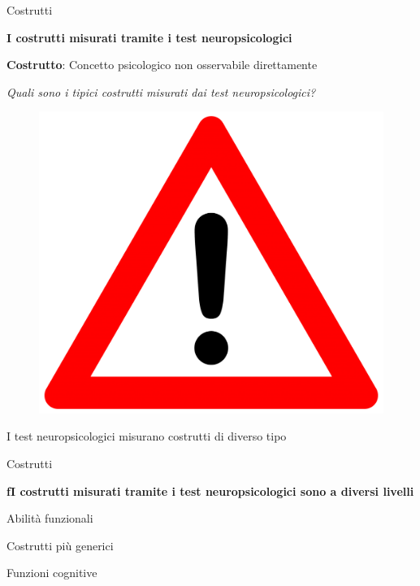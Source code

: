 \documentclass[
  ignorenonframetext,
]{beamer}
\begin{document}
\begin{frame}{Costrutti}
\label{costrutti}
\begin{center}
  \textbf{I costrutti misurati tramite i test neuropsicologici}
\end{center}

\textbf{Costrutto}: Concetto psicologico non osservabile direttamente

\emph{Quali sono i tipici costrutti misurati dai test neuropsicologici?}

\begin{figure}
  \includegraphics[scale=0.05]{Figures/triangle.png}
\end{figure}

I test neuropsicologici misurano costrutti di diverso tipo
\end{frame}

\begin{frame}{Costrutti}
\label{costrutti-1}
\begin{center}
  \textbf{fI costrutti misurati tramite i test neuropsicologici sono a diversi livelli}
  \vspace{2em}

  Abilità funzionali
  
  {\small Costrutti più generici}
  
  {\footnotesize Funzioni cognitive}
\end{center}
\end{frame}
\end{document}
